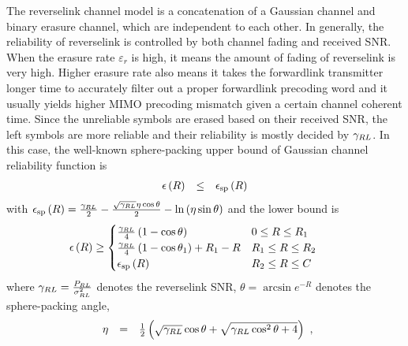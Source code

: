 \documentclass[10pt,fleqn, twocolumn]{IEEEtran}
\begin{document}
The reverselink channel model is a concatenation of a Gaussian
channel and binary erasure channel, which are independent to each
other. In generally, the reliability of reverselink is controlled
by both channel fading and received SNR. When the erasure rate
$\varepsilon_{r}$ is high, it means the amount of fading of
reverselink is very high. Higher erasure rate also means it takes
the forwardlink transmitter longer time to accurately filter out a
proper forwardlink precoding word and it usually yields higher
MIMO precoding mismatch given a certain channel coherent time.
Since the unreliable symbols are erased based on their received
SNR, the left symbols are more reliable and their reliability is
mostly decided by $\gamma_{\mbox{\tiny RL}}$. In this case, the
well-known sphere-packing upper bound of Gaussian channel
reliability function is
\begin{equation}%
\begin{array}{rcl}
\epsilon\left(R\right)&\leq&\epsilon_{\rm sp}\left(R\right)
\end{array}\label{reliability_upper_bound}
\end{equation}
\noindent with $\epsilon_{\rm
sp}\left(R\right)=\frac{\gamma_{\mbox{\tiny
RL}}}{2}-\frac{\sqrt{\gamma_{\mbox{\tiny
RL}}}\eta\cos\theta}{2}-\ln\left(\eta\sin\theta\right)$ and the
lower bound is
\begin{equation}\hspace{-0.30in}
\begin{array}{l}
\epsilon\left(R\right)\geq\begin{cases} \frac{\gamma_{\mbox{\tiny
RL}}}{4}\left(1-\cos\theta\right) &
0\leq R\leq R_{1} \\
\frac{\gamma_{\mbox{\tiny RL}}}{4}\left(1-\cos\theta_{1}\right)
+R_{1}-R&
R_{1}\leq R\leq R_{2} \\
\epsilon_{\rm sp}\left(R\right) &R_{2}\leq R\leq C
\end{cases}
\end{array}\label{reliability_lower_bound}
\end{equation}
\noindent where $\gamma_{\mbox{\tiny RL}}=\frac{P_{\mbox{\tiny
RL}}}{\sigma^2_{\mbox{\tiny RL}}}$ denotes the reverselink SNR,
$\theta=\arcsin e^{-R}$ denotes the sphere-packing angle,
\begin{equation}\hspace{-0.0in}
\begin{array}{rcl}
\eta&=&\frac{1}{2}\left(\sqrt{\gamma_{\mbox{\tiny
RL}}}\cos\theta+\sqrt{\gamma_{\mbox{\tiny
RL}}\cos^2\theta+4}\right)
\end{array},
\end{equation}
\end{document}
